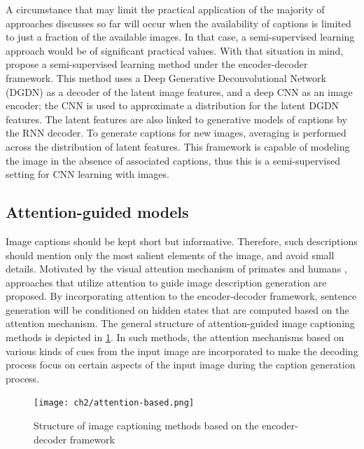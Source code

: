 A circumstance that may limit the practical application of the majority of approaches discusses so far will occur when the availability of captions is limited to just a fraction of the available images. In that case, a semi-supervised learning approach would be of significant practical values. With that situation in mind, \citet{Pu2016_VAE} propose a semi-supervised learning method under the encoder-decoder framework. This method uses a Deep Generative Deconvolutional Network (DGDN) \citep{Pu2016_DGDN} as a decoder of the latent image features, and a deep CNN as an image encoder; the CNN is used to approximate a distribution for the latent DGDN features. The latent features are also linked to generative models of captions by the RNN decoder. To generate captions for new images, averaging is performed across the distribution of latent features. This framework is capable of modeling the image in the absence of associated captions, thus this is a semi-supervised setting for CNN learning with images. 

\subsection{Attention-guided models}\label{sec:attention-guided_models}

Image captions should be kept short but informative. Therefore, such descriptions should mention only the most salient elements of the image, and avoid small details. Motivated by the visual attention mechanism of primates and humans \citep{Rensink2000, Spratling2004}, approaches that utilize attention to guide image description generation are proposed. By incorporating attention to the encoder-decoder framework, sentence generation will be conditioned on hidden states that are computed based on the attention mechanism. The general structure of attention-guided image captioning methods is depicted in \cref{fig:attention-based}. In such methods, the attention mechanisms based on various kinds of cues from the input image are incorporated to make the decoding process focus on certain aspects of the input image during the caption generation process.

\begin{figure}[hpt]
    \centering
    \texttt{[image: ch2/attention-based.png]}
    \caption{Structure of image captioning methods based on the encoder-decoder framework}
    \label{fig:attention-based}
\end{figure}

